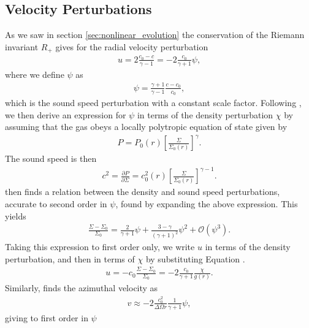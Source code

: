 \subsection{Velocity Perturbations} \label{sec:velocity_perts}

As we saw in section \ref{sec:nonlinear_evolution} the conservation of the Riemann invariant $R_+$ gives for the radial velocity perturbation
\begin{align}
    u = 2\frac{c_0-c}{\gamma - 1}=-2\frac{c_0}{\gamma + 1} \psi, \label{eq:u_rafikov}
\end{align}
where we define $\psi$ as
\begin{align}
    \psi = \frac{\gamma+1}{\gamma-1} \frac{c - c_0}{c_0},
\end{align}
which is the sound speed perturbation with a constant scale factor. Following \citet{rafikov2002a}, we then derive an expression for $\psi$ in terms of the density perturbation $\chi$ by assuming that the gas obeys a locally polytropic equation of state given by 
\begin{align}
    P = P_0(r) \left[ \frac{\Sigma}{\Sigma_0(r)} \right]^\gamma. \label{eq:poly_EOS}
\end{align}
The sound speed is then
\begin{align}
    c^2 = \frac{\partial P}{\partial \Sigma} = c_0^2(r) \left[ \frac{\Sigma}{\Sigma_0(r)} \right]^{\gamma-1}.
\end{align}
\citet{rafikov2002a} then finds a relation between the density and sound speed perturbations, accurate to second order in $\psi$, found by expanding the above expression. 
This yields
\begin{align}
    \frac{\Sigma - \Sigma_0}{\Sigma_0} = \frac{2}{\gamma + 1}\psi + \frac{3 - \gamma}{\left( \gamma + 1  \right)^2} \psi^2 + \mathcal{O}(\psi^3). \label{eq:psi_exp}
\end{align}
Taking this expression to first order only, we write $u$ in terms of the density perturbation, and then in terms of $\chi$ by substituting Equation \feqr. 
\begin{align}
    u = - c_0 \frac{\Sigma - \Sigma_0}{\Sigma_0} = -2 \frac{c_0}{\gamma + 1} \frac{\chi}{g(r)}. \label{eq:ap_rad_vel}
\end{align}
Similarly, \citet{rafikov2002a} finds the azimuthal velocity as
\begin{align}
    v \approx -2 \frac{c_0^2}{\Delta\Omega r} \frac{1}{\gamma + 1} \psi, \label{eq:v_rafikov}
\end{align}
giving to first order in $\psi$
